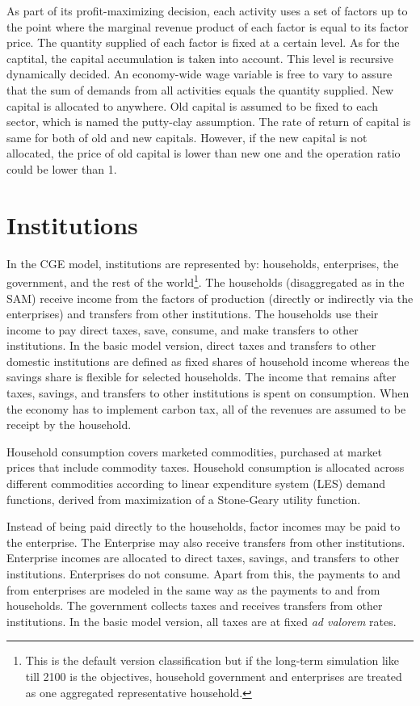 \documentclass[10pt,a4paper,titlepage,dvipdfmx]{book}
\begin{document}
As part of its profit-maximizing decision, each activity uses a set of factors up to the point where the marginal revenue product of each factor is equal to its factor price. The quantity supplied of each factor is fixed at a certain level. As for the captital, the capital accumulation is taken into account. This level is recursive dynamically decided. An economy-wide wage variable is free to vary to assure that the sum of demands from all activities equals the quantity supplied. New capital is allocated to anywhere. Old capital is assumed to be fixed to each sector, which is named the putty-clay assumption. The rate of return of capital is same for both of old and new capitals. However, if the new capital is not allocated, the price of old capital is lower than new one and the operation ratio could be lower than 1. 

\section{\label{sec:Inst}Institutions}

In the CGE model, institutions are represented by: households, enterprises, the government, and the rest of the world\footnote{This is the default version classification but if the long-term simulation like till 2100 is the objectives, household government and enterprises are treated as one aggregated representative household. }. The households (disaggregated as in the SAM) receive income from the factors of production (directly or indirectly via the enterprises) and transfers from other institutions. The households use their income to pay direct taxes, save, consume, and make transfers to other institutions. In the basic model version, direct taxes and transfers to other domestic institutions are defined as fixed shares of household income whereas the savings share is flexible for selected households. The income that remains after taxes, savings, and transfers to other institutions is spent on consumption. When the economy has to implement carbon tax, all of the revenues are assumed to be receipt by the household.

Household consumption covers marketed commodities, purchased at market prices that include commodity taxes. Household consumption is allocated across different commodities according to linear expenditure system (LES) demand functions, derived from maximization of a Stone-Geary utility function.

Instead of being paid directly to the households, factor incomes may be paid to the enterprise. The Enterprise may also receive transfers from other institutions. Enterprise incomes are allocated to direct taxes, savings, and transfers to other institutions. Enterprises do not consume. Apart from this, the payments to and from enterprises are modeled in the same way as the payments to and from households. The government collects taxes and receives transfers from other institutions. In the basic model version, all taxes are at fixed \textit{ad valorem} rates. 
\end{document}
